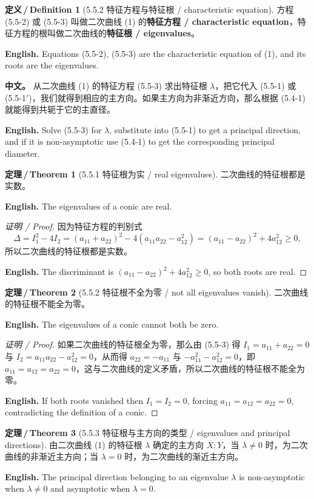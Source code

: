 \documentclass[UTF8,11pt,a4paper]{ctexart}
\newcommand{\APS}[2]{\par\noindent\textbf{中文。} #1\par\noindent\textbf{English.} #2\par\smallskip}
\newcommand{\EN}[1]{\par\noindent \textbf{English.} #1\par}
\theoremstyle{definition}
\newtheorem*{definition}{定义\,/\,Definition}
\newtheorem*{theorem}{定理\,/\,Theorem}
\begin{document}
\begin{definition}[5.5.2 特征方程与特征根 / characteristic equation]\label{def:chareq}
方程 (5.5-2) 或 (5.5-3) 叫做二次曲线 (1) 的\textbf{特征方程 / characteristic equation}，特征方程的根叫做二次曲线的\textbf{特征根 / eigenvalues}。
\EN{Equations (5.5-2), (5.5-3) are the characteristic equation of (1), and its roots are the eigenvalues.}
\end{definition}

\APS{从二次曲线 (1) 的特征方程 (5.5-3) 求出特征根 $\lambda$，把它代入 (5.5-1) 或 (5.5-1$'$)，我们就得到相应的主方向。如果主方向为非渐近方向，那么根据 (5.4-1) 就能得到共轭于它的主直径。}{Solve (5.5-3) for $\lambda$, substitute into (5.5-1) to get a principal direction, and if it is non-asymptotic use (5.4-1) to get the corresponding principal diameter.}

\begin{theorem}[5.5.1 特征根为实 / real eigenvalues]\label{thm:real-eig}
二次曲线的特征根都是实数。
\EN{The eigenvalues of a conic are real.}
\end{theorem}

\begin{proof}[证明 / Proof]
因为特征方程的判别式
\[
\Delta=I_1^2-4I_2=(a_{11}+a_{22})^2-4(a_{11}a_{22}-a_{12}^2)=(a_{11}-a_{22})^2+4a_{12}^2\ge0,
\]
所以二次曲线的特征根都是实数。
\EN{The discriminant is $(a_{11}-a_{22})^2+4a_{12}^2\ge0$, so both roots are real.}
\end{proof}

\begin{theorem}[5.5.2 特征根不全为零 / not all eigenvalues vanish]\label{thm:nonzero-eig}
二次曲线的特征根不能全为零。
\EN{The eigenvalues of a conic cannot both be zero.}
\end{theorem}

\begin{proof}[证明 / Proof]
如果二次曲线的特征根全为零，那么由 (5.5-3) 得 $I_1=a_{11}+a_{22}=0$ 与 $I_2=a_{11}a_{22}-a_{12}^2=0$，从而得 $a_{22}=-a_{11}$ 与 $-a_{11}^2-a_{12}^2=0$，即 $a_{11}=a_{12}=a_{22}=0$，这与二次曲线的定义矛盾，所以二次曲线的特征根不能全为零。
\EN{If both roots vanished then $I_1=I_2=0$, forcing $a_{11}=a_{12}=a_{22}=0$, contradicting the definition of a conic.}
\end{proof}

\begin{theorem}[5.5.3 特征根与主方向的类型 / eigenvalues and principal directions]\label{thm:eig-dir}
由二次曲线 (1) 的特征根 $\lambda$ 确定的主方向 $X:Y$，当 $\lambda\ne0$ 时，为二次曲线的非渐近主方向；当 $\lambda=0$ 时，为二次曲线的渐近主方向。
\EN{The principal direction belonging to an eigenvalue $\lambda$ is non-asymptotic when $\lambda\ne0$ and asymptotic when $\lambda=0$.}
\end{theorem}
\end{document}
